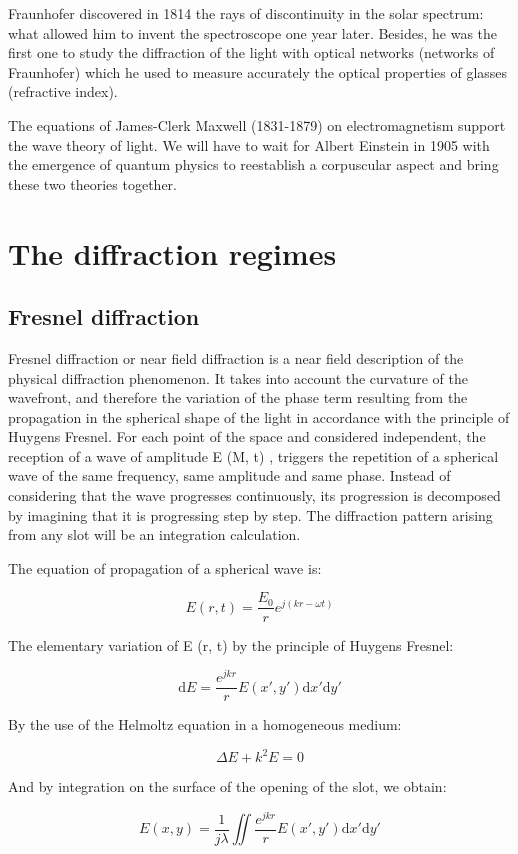\documentclass[10pt,a4paper]{article}
\begin{document}
Fraunhofer discovered in 1814 the rays of discontinuity in the solar spectrum: what allowed him to invent the spectroscope one year later. Besides, he was the first one to study the diffraction of the light with optical networks (networks of Fraunhofer) which he used to measure accurately the optical properties of glasses (refractive index). 

The equations of James-Clerk Maxwell (1831-1879) on electromagnetism support the wave theory of light. We will have to wait for Albert Einstein in 1905 with the emergence of quantum physics to reestablish a corpuscular aspect and bring these two theories together.

\section{The diffraction regimes}
	\subsection{Fresnel diffraction}
Fresnel diffraction or near field diffraction is a near field description of the physical diffraction phenomenon. It takes into account the curvature of the wavefront, and therefore the variation of the phase term resulting from the propagation in the spherical shape of the light in accordance with the principle of Huygens Fresnel. For each point of the space and considered independent, the reception of a wave of amplitude E (M, t) , triggers the repetition of a spherical wave of the same frequency, same amplitude and same phase. Instead of considering that the wave progresses continuously, its progression is decomposed by imagining that it is progressing step by step. The diffraction pattern arising from any slot will be an integration calculation. 

The equation of propagation of a spherical wave is:

\[E(r,t)= \frac{E_0}{r} e^{j(kr-\omega t)}\]

The elementary variation of E (r, t) by the principle of Huygens Fresnel:

\[\mathrm{d}E=\frac{e^{jkr}}{r} E(x',y') \mathrm{d}x' \mathrm{d}y'\]

By the use of the Helmoltz equation in a homogeneous medium: 

\[\Delta E+k^2 E=0\]

And by integration on the surface of the opening of the slot, we obtain:

\[E(x,y)=\frac{1}{j\lambda} \iint \frac{e^{jkr}}{r}E(x',y')\mathrm{d}x'\mathrm{d}y'\]
\end{document}
